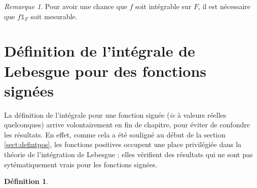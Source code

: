 \documentclass[french]{report}
\theoremstyle{plain}
\theoremstyle{definition}
\newtheorem{defi}{Définition}[section]
\theoremstyle{remark}
\newtheorem{rem}{Remarque}[section]
\begin{document}
\begin{rem}
  Pour avoir une chance que $f$ soit intégrable sur $F$, il est nécessaire que $f\mathds{1}_F$ soit mesurable.
\end{rem}


\section{Définition de l'intégrale de Lebesgue pour des fonctions signées}

La définition de l'intégrale pour une fonction signée (\textit{ie} à valeurs réelles quelconques) arrive volontairement en fin de chapitre, pour éviter de confondre les résultats.
En effet, comme cela a été souligné au début de la section \ref{sect:defintpos}, les fonctions positives occupent une place privilégiée dans la théorie de l'intégration de Lebesgue ; elles vérifient des résultats qui ne sont pas sytématiquement vrais pour les fonctions signées.


\begin{defi}
\end{defi}
\end{document}
